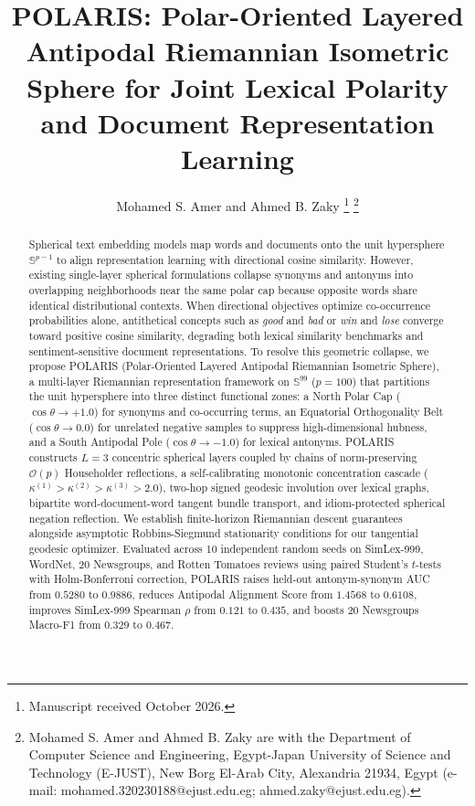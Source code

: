 \documentclass[journal]{IEEEtran}
\begin{document}
\title{POLARIS: Polar-Oriented Layered Antipodal Riemannian Isometric Sphere for Joint Lexical Polarity and Document Representation Learning}

\author{Mohamed S. Amer and Ahmed B. Zaky%
\thanks{Manuscript received October 2026.}%
\thanks{Mohamed S. Amer and Ahmed B. Zaky are with the Department of Computer Science and Engineering, Egypt-Japan University of Science and Technology (E-JUST), New Borg El-Arab City, Alexandria 21934, Egypt (e-mail: mohamed.320230188@ejust.edu.eg; ahmed.zaky@ejust.edu.eg).}}

\maketitle

\begin{abstract}
Spherical text embedding models map words and documents onto the unit hypersphere $\mathbb{S}^{p-1}$ to align representation learning with directional cosine similarity. However, existing single-layer spherical formulations collapse synonyms and antonyms into overlapping neighborhoods near the same polar cap because opposite words share identical distributional contexts. When directional objectives optimize co-occurrence probabilities alone, antithetical concepts such as \textit{good} and \textit{bad} or \textit{win} and \textit{lose} converge toward positive cosine similarity, degrading both lexical similarity benchmarks and sentiment-sensitive document representations. To resolve this geometric collapse, we propose POLARIS (Polar-Oriented Layered Antipodal Riemannian Isometric Sphere), a multi-layer Riemannian representation framework on $\mathbb{S}^{99}$ ($p=100$) that partitions the unit hypersphere into three distinct functional zones: a North Polar Cap ($\cos\theta\to+1.0$) for synonyms and co-occurring terms, an Equatorial Orthogonality Belt ($\cos\theta\to0.0$) for unrelated negative samples to suppress high-dimensional hubness, and a South Antipodal Pole ($\cos\theta\to-1.0$) for lexical antonyms. POLARIS constructs $L=3$ concentric spherical layers coupled by chains of norm-preserving $\mathcal{O}(p)$ Householder reflections, a self-calibrating monotonic concentration cascade ($\kappa^{(1)}>\kappa^{(2)}>\kappa^{(3)}>2.0$), two-hop signed geodesic involution over lexical graphs, bipartite word-document-word tangent bundle transport, and idiom-protected spherical negation reflection. We establish finite-horizon Riemannian descent guarantees alongside asymptotic Robbins-Siegmund stationarity conditions for our tangential geodesic optimizer. Evaluated across 10 independent random seeds on SimLex-999, WordNet, 20 Newsgroups, and Rotten Tomatoes reviews using paired Student's $t$-tests with Holm-Bonferroni correction, POLARIS raises held-out antonym-synonym AUC from $0.5280$ to $0.9886$, reduces Antipodal Alignment Score from $1.4568$ to $0.6108$, improves SimLex-999 Spearman $\rho$ from $0.121$ to $0.435$, and boosts 20 Newsgroups Macro-F1 from $0.329$ to $0.467$.
\end{abstract}
\end{document}
